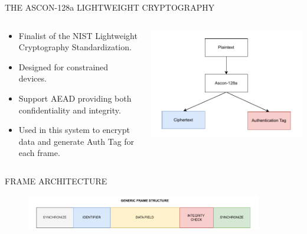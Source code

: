 \begin{frame}{THE ASCON-128a LIGHTWEIGHT CRYPTOGRAPHY}
\begin{columns}
        \begin{column}{0.55\textwidth}
            \begin{itemize}
                \item Finalist of the NIST Lightweight Cryptography Standardization.
                \item Designed for constrained devices.
                \item Support AEAD providing both confidentiality and integrity.
                \item Used in this system to encrypt data and generate Auth Tag for each frame.
            \end{itemize}
        \end{column}
        \begin{column}{0.45\textwidth}
            \centering
            \includegraphics[width=1\linewidth]{pic/ascon.pdf}
        \end{column}
    \end{columns}
\end{frame}

\begin{frame}{FRAME ARCHITECTURE}
    \vspace{-0.32cm}
    \begin{figure}
    	\centering
    	\includegraphics[width=0.92\textwidth]{pic/gframe.pdf}
    \end{figure}
\end{frame}

